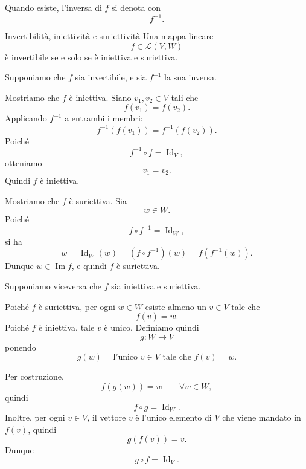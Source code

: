 \documentclass[a4paper]{article}
\begin{document}
Quando esiste, l'inversa di \(f\) si denota con
\[
    f^{-1}.
\]

\begin{snippetproposition}{Invertibilità, iniettività e suriettività}
    Una mappa lineare
    \[
        f\in\mathcal{L}(V,W)
    \]
    è invertibile se e solo se è iniettiva e suriettiva.
\end{snippetproposition}

\begin{snippetproof}{}
    \begin{iffproof}
    \item Supponiamo che \(f\) sia invertibile, e sia \(f^{-1}\) la sua inversa.

        Mostriamo che \(f\) è iniettiva. Siano \(v_1,v_2\in V\) tali che
        \[
            f(v_1)=f(v_2).
        \]
        Applicando \(f^{-1}\) a entrambi i membri:
        \[
            f^{-1}(f(v_1))=f^{-1}(f(v_2)).
        \]
        Poiché
        \[
            f^{-1}\circ f=\operatorname{Id}_V,
        \]
        otteniamo
        \[
            v_1=v_2.
        \]
        Quindi \(f\) è iniettiva.

        Mostriamo che \(f\) è suriettiva. Sia
        \[
            w\in W.
        \]
        Poiché
        \[
            f\circ f^{-1}=\operatorname{Id}_W,
        \]
        si ha
        \[
            w
            =
            \operatorname{Id}_W(w)
            =
            (f\circ f^{-1})(w)
            =
            f(f^{-1}(w)).
        \]
        Dunque \(w\in\operatorname{Im}f\), e quindi \(f\) è suriettiva.

    \item Supponiamo viceversa che \(f\) sia iniettiva e suriettiva.

        Poiché \(f\) è suriettiva, per ogni \(w\in W\) esiste almeno un \(v\in V\) tale che
        \[
            f(v)=w.
        \]
        Poiché \(f\) è iniettiva, tale \(v\) è unico. Definiamo quindi
        \[
            g:W\to V
        \]
        ponendo
        \[
            g(w)=\text{l'unico }v\in V\text{ tale che }f(v)=w.
        \]

        Per costruzione,
        \[
            f(g(w))=w
            \qquad
            \forall w\in W,
        \]
        quindi
        \[
            f\circ g=\operatorname{Id}_W.
        \]
        Inoltre, per ogni \(v\in V\), il vettore \(v\) è l'unico elemento di \(V\) che viene mandato in \(f(v)\), quindi
        \[
            g(f(v))=v.
        \]
        Dunque
        \[
            g\circ f=\operatorname{Id}_V.
        \]


\end{iffproof}
\end{snippetproof}
\end{document}
